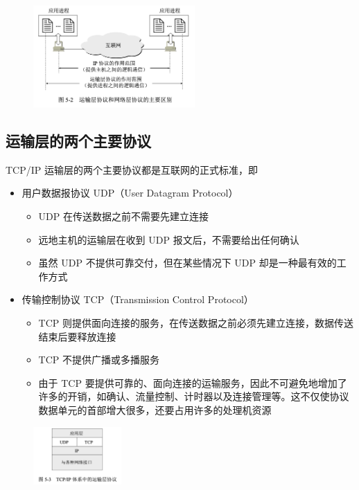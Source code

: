 \documentclass[cs4size,a4paper,10pt]{ctexart}
\begin{document}
	\begin{figure}[H]
		\centering
		\includegraphics[width=0.55\textwidth]{img/5.2}
	\end{figure}

	\subsection{运输层的两个主要协议}
	TCP/IP 运输层的两个主要协议都是互联网的正式标准，即
	\begin{itemize}
		\item 用户数据报协议 UDP（User Datagram Protocol）
		\begin{itemize}
			\item UDP 在传送数据之前不需要先建立连接
			\item 远地主机的运输层在收到 UDP 报文后，不需要给出任何确认
			\item 虽然 UDP 不提供可靠交付，但在某些情况下 UDP 却是一种最有效的工作方式
		\end{itemize}
		\item 传输控制协议 TCP（Transmission Control Protocol）
		\begin{itemize}
			\item TCP 则提供面向连接的服务，在传送数据之前必须先建立连接，数据传送结束后要释放连接
			\item TCP 不提供广播或多播服务
			\item 由于 TCP 要提供可靠的、面向连接的运输服务，因此不可避免地增加了许多的开销，如确认、流量控制、计时器以及连接管理等。这不仅使协议数据单元的首部增大很多，还要占用许多的处理机资源
		\end{itemize}
	\end{itemize}

	\begin{figure}[H]
		\centering
		\includegraphics[width=0.3\textwidth]{img/5.3}
	\end{figure}
\end{document}
